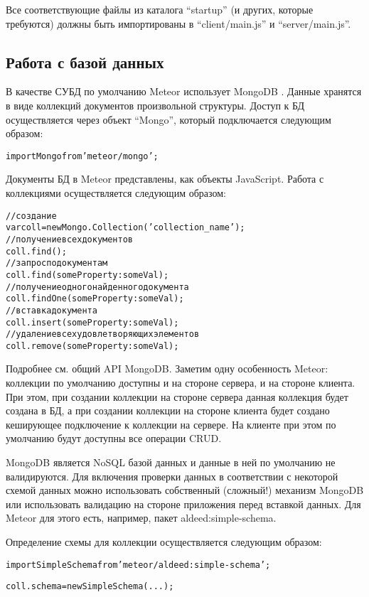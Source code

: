 \documentclass[a4paper,12pt]{article}
\begin{document}
Все соответствующие файлы из каталога ``startup'' (и
других, которые требуются) должны быть
импортированы в ``client/main.js'' и ``server/main.js''.

\subsection{Работа с базой данных}
В качестве СУБД по умолчанию Meteor использует MongoDB \cite{X}. 
Данные хранятся в виде коллекций документов произвольной структуры.
Доступ к БД осуществляется через объект ``Mongo'', который подключается
следующим образом:

\begin{alltt}
import { Mongo } from 'meteor/mongo';
\end{alltt}

Документы БД в Meteor представлены, как объекты JavaScript.
Работа с коллекциями осуществляется следующим образом:

\begin{alltt}
// создание
var coll = new Mongo.Collection('collection\_name'); 
// получение всех документов
coll.find();
// запрос по документам
coll.find({someProperty: someVal});
// получение одного найденного документа
coll.findOne({someProperty: someVal});
// вставка документа
coll.insert({someProperty: someVal});
// удаление всех удовлетворяющих элементов
coll.remove({someProperty: someVal});
\end{alltt}

Подробнее см. общий API MongoDB. Заметим одну особенность Meteor:
коллекции по умолчанию доступны и на стороне сервера, и на стороне
клиента. При этом, при создании коллекции на стороне сервера
данная коллекция будет создана в БД, а при создании
коллекции на стороне клиента будет создано кеширующее подключение
к коллекции на сервере. На клиенте при этом по умолчанию будут
доступны все операции CRUD.

MongoDB является NoSQL базой данных и данные в ней по умолчанию
не валидируются. Для включения проверки данных в соответствии
с некоторой схемой данных можно использовать собственный (сложный!)
механизм MongoDB или использовать валидацию на стороне приложения
перед вставкой данных. Для Meteor для этого есть, например, пакет
aldeed:simple-schema.

Определение схемы для коллекции осуществляется следующим образом:
\begin{alltt}
	import { SimpleSchema } from 'meteor/aldeed:simple-schema';
	
	coll.schema = new SimpleSchema({...});
\end{alltt}
\end{document}
